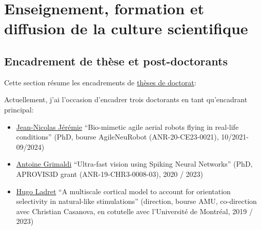 \documentclass[10pt,french,a4paper,oneside]{article}%
\begin{document}
\section{Enseignement, formation et diffusion de la culture scientifique} %

\subsection{Encadrement de thèse et post-doctorants} %

%
%
Cette section résume les encadrements de \href{https://www.theses.fr/074493701}{thèses de doctorat}:

Actuellement, j'ai l'occasion d'encadrer trois doctorants %
en tant qu'encadrant principal:
\begin{itemize}
	\item \href{https://laurentperrinet.github.io/author/jean-nicolas-jeremie/}{Jean-Nicolas Jérémie} 	``Bio-mimetic agile aerial robots flying in real-life conditions'' (PhD, bourse AgileNeuRobot (ANR-20-CE23-0021), 10/2021-09/2024)
	\item \href{https://laurentperrinet.github.io/author/antoine-grimaldi/}{Antoine Grimaldi} ``Ultra-fast vision using Spiking Neural Networks'' (PhD, APROVIS3D grant (ANR-19-CHR3-0008-03), 2020 / 2023)
	\item \href{https://laurentperrinet.github.io/authors/hugo-ladret/}{Hugo Ladret} ``A multiscale cortical model to account for orientation selectivity in natural-like stimulations''  (direction, bourse AMU, co-direction avec Christian Casanova, en cotutelle avec l'Université de Montréal, 2019 / 2023)
\end{itemize}

\end{document}
